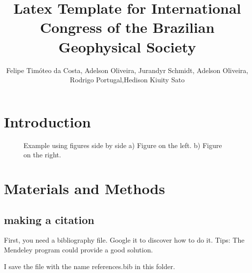 \documentclass[twoside,letterpaper,twocolumn]{article}
\title{Latex Template for International Congress of the Brazilian Geophysical Society}
\author{Felipe Timóteo da Costa, Adelson Oliveira, Jurandyr Schmidt, Adelson Oliveira, Rodrigo Portugal,Hedison Kiuity Sato}
\begin{document}
\maketitle

\begin{abstract}

\lipsum[1]

\end{abstract}

\section{Introduction}

\lipsum[2]

\begin{figure}[h!]
	\centering
	\caption{Example using figures side by side a) Figure on the left. b) Figure on the right. }
	\label{fig:label3}
\end{figure}

\lipsum[6]

\section{Materials and Methods}

\subsection{making a citation}

First, you need a bibliography file. Google it to discover how to do it. Tips: The Mendeley program could provide a good solution.

I save the file with the name references.bib in this folder.
\end{document}

